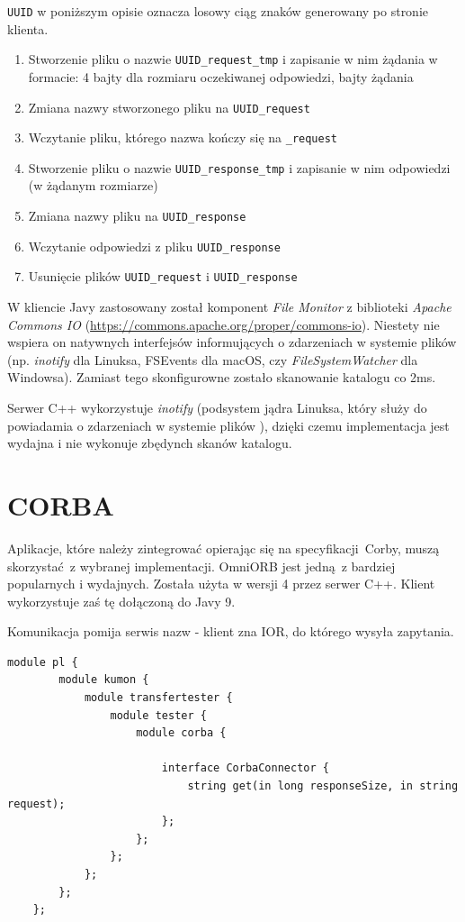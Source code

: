 \texttt{UUID} w poniższym opisie oznacza losowy ciąg znaków generowany po stronie klienta.
\begin{enumerate}
    \item Stworzenie pliku o nazwie \texttt{UUID\_request\_tmp} i zapisanie w nim żądania w formacie: 4 bajty dla rozmiaru oczekiwanej odpowiedzi, bajty żądania
    \item Zmiana nazwy stworzonego pliku na \texttt{UUID\_request}
    \item Wczytanie pliku, którego nazwa kończy się na \texttt{\_request}
    \item Stworzenie pliku o nazwie \texttt{UUID\_response\_tmp} i zapisanie w nim odpowiedzi (w żądanym rozmiarze)
    \item Zmiana nazwy pliku na \texttt{UUID\_response}
    \item Wczytanie odpowiedzi z pliku \texttt{UUID\_response}
    \item Usunięcie plików \texttt{UUID\_request} i \texttt{UUID\_response}
\end{enumerate}

W kliencie Javy zastosowany został komponent \textit{File Monitor} z biblioteki \textit{Apache Commons IO} (\url{https://commons.apache.org/proper/commons-io}). Niestety nie wspiera on natywnych interfejsów informujących o zdarzeniach w systemie plików (np. \textit{inotify} dla Linuksa, FSEvents dla macOS, czy \textit{FileSystemWatcher} dla Windowsa). Zamiast tego skonfigurowne zostało skanowanie katalogu co 2ms.

Serwer C++ wykorzystuje \textit{inotify} (podsystem jądra Linuksa, który służy do powiadamia o zdarzeniach w systemie plików \cite{inotify_man}), dzięki czemu implementacja jest wydajna i nie wykonuje zbędynch skanów katalogu.


\section{CORBA}

Aplikacje, które należy zintegrować opierając się na specyfikacji Corby, muszą skorzystać z wybranej implementacji. OmniORB jest jedną z bardziej popularnych i wydajnych. Została użyta w wersji 4 przez serwer C++. Klient wykorzystuje zaś tę dołączoną do Javy 9.

Komunikacja pomija serwis nazw - klient zna IOR, do którego wysyła zapytania.

\begin{lstlisting}[caption={Zastosowany interfejs (IDL)},captionpos=b]
    module pl {
        module kumon {
            module transfertester {
                module tester {
                    module corba {

                        interface CorbaConnector {
                            string get(in long responseSize, in string request);
                        };
                    };
                };
            };
        };
    };
\end{lstlisting}

